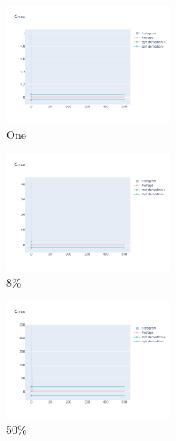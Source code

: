 \documentclass[12pt, fleqn]{report}                             %
\theoremstyle{break}                                            %
\begin{document}
      \begin{figure}[ht!]
        \centering
        \begin{subfigure}[b]{0.4\linewidth}
          \includegraphics[width=0.6\textwidth]{Images/168/dia-a.png}
          \caption{One}
        \end{subfigure}
        \begin{subfigure}[b]{0.4\linewidth}
          \includegraphics[width=0.6\textwidth]{Images/168/dia-b.png}
          \caption{8\%}
        \end{subfigure}
        \begin{subfigure}[b]{0.4\linewidth}
          \includegraphics[width=0.6\textwidth]{Images/168/dia-c.png}
          \caption{50\%}
        \end{subfigure}
        \begin{subfigure}[b]{0.4\linewidth}

\end{subfigure}
\end{figure}
\end{document}
